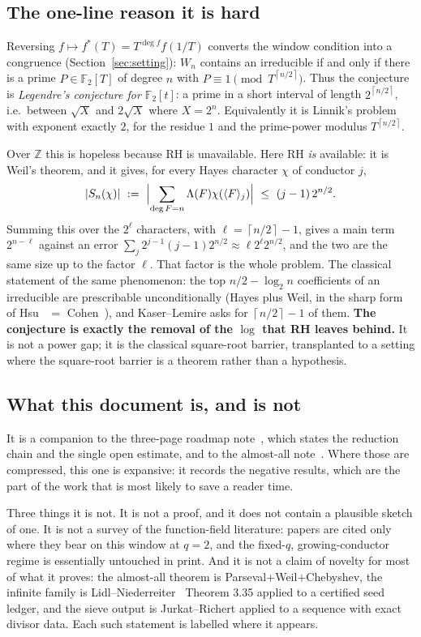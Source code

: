 \documentclass[10pt]{article}
\theoremstyle{plain}
\theoremstyle{definition}
\newcommand{\F}{\mathbb F}
\newcommand{\Z}{\mathbb Z}
\newcommand{\Lam}{\Lambda}
\newcommand{\ceil}[1]{\left\lceil #1\right\rceil}
\begin{document}
\subsection{The one-line reason it is hard}

Reversing $f\mapsto f^*(T)=T^{\deg f}f(1/T)$ converts the window condition into
a congruence (Section~\ref{sec:setting}): $W_n$ contains an irreducible if and
only if there is a prime $P\in\F_2[T]$ of degree $n$ with
$P\equiv1\pmod{T^{\ceil{n/2}}}$. Thus the conjecture is
\emph{Legendre's conjecture for $\F_2[t]$}: a prime in a short interval of
length $2^{\ceil{n/2}}$, i.e.\ between $\sqrt X$ and $2\sqrt X$ where
$X=2^n$. Equivalently it is Linnik's problem with exponent exactly $2$, for
the residue $1$ and the prime-power modulus $T^{\ceil{n/2}}$.

Over $\Z$ this is hopeless because RH is unavailable. Here RH \emph{is}
available: it is Weil's theorem, and it gives, for every Hayes character $\chi$
of conductor $j$,
\[
 |S_n(\chi)|\ :=\ \Bigl|\sum_{\deg F=n}\Lam(F)\chi(\langle F\rangle_j)\Bigr|
 \ \le\ (j-1)\,2^{n/2}.
\]
Summing this over the $2^{\ell}$ characters, with $\ell=\ceil{n/2}-1$, gives a
main term $2^{n-\ell}$ against an error $\sum_j 2^{j-1}(j-1)2^{n/2}\approx
\ell2^{\ell}2^{n/2}$, and the two are the same size up to the factor $\ell$.
That factor is the whole problem. The classical statement of the same
phenomenon: the top $n/2-\log_2 n$ coefficients of an irreducible are
prescribable unconditionally (Hayes plus Weil, in the sharp form of
Hsu~\cite{Hsu} $=$ Cohen~\cite{Cohen}), and Kaser--Lemire asks for
$\ceil{n/2}-1$ of them. \textbf{The conjecture is exactly the removal of the
$\log$ that RH leaves behind.} It is not a power gap; it is the classical
square-root barrier, transplanted to a setting where the square-root barrier
is a theorem rather than a hypothesis.

\subsection{What this document is, and is not}

It is a companion to the three-page roadmap note~\cite{roadmap}, which states
the reduction chain and the single open estimate, and to the almost-all
note~\cite{almostall}. Where those are compressed, this one is expansive: it
records the negative results, which are the part of the work that is most
likely to save a reader time.

Three things it is not. It is not a proof, and it does not contain a plausible
sketch of one. It is not a survey of the function-field literature: papers are
cited only where they bear on this window at $q=2$, and the fixed-$q$,
growing-conductor regime is essentially untouched in print. And it is not a
claim of novelty for most of what it proves: the almost-all theorem is
Parseval$+$Weil$+$Chebyshev, the infinite family is
Lidl--Niederreiter~\cite{LN} Theorem 3.35 applied to a certified seed ledger,
and the sieve output is Jurkat--Richert applied to a sequence with exact
divisor data. Each such statement is labelled where it appears.
\end{document}
